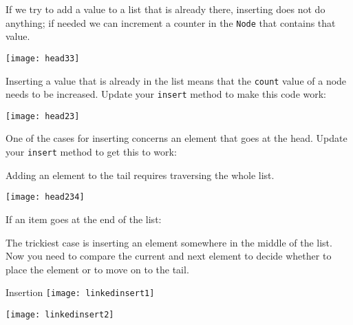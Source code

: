 
If we try to add a value to a list that is already there,
inserting does not do anything;
if needed we can increment a counter in the 
\lstinline{Node} that contains that value.

\texttt{[image: head33]}

\begin{exercise}
  \label{ex:linklist-insert-already}
  Inserting a value that is already in the list means that the
  \lstinline{count} value of a node needs to be increased. Update your
  \lstinline{insert} method to make this code work:
\end{exercise}

\par

\texttt{[image: head23]}

\begin{exercise}
  \label{ex:linklist-insert-head}
  One of the cases for inserting concerns an element that goes at the
  head. Update your \lstinline{insert} method to get this to work:
\end{exercise}

\par

Adding an element to the tail requires traversing the whole list.

\texttt{[image: head234]}

\begin{exercise}
  \label{ex:linklist-insert-tail}
  If an item goes at the end of the list:
\end{exercise}

\par

The trickiest case is inserting an element somewhere in the middle of the list.
Now you need to compare the current and next element to decide whether to
place the element or to move on to the tail.

\begin{block}{Insertion}
  \label{sl:linklist-insert-middle}
  \texttt{[image: linkedinsert1]}

  \texttt{[image: linkedinsert2]}
\end{block}


